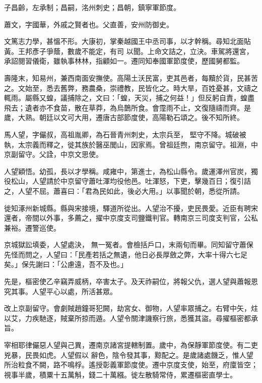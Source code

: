 \begin{pinyinscope}
 子昌齡，左承制；昌嗣，洺州刺史；昌朝，鎮寧軍節度。



 蕭文，字國華，外戚之賢者也。父直善，安州防御史。



 文篤志力學，甚慍不形。大康初，掌秦越國王中丞司事，以才幹稱。尋知北面貼黃。王邦彥子爭蔭，數歲不能定，有司
 以聞。上命文詰之，立決。車駕將還宮，承詔閱習儀衛，雖執事林林，指顧如一。遷同知奉國軍節度使，歷國舅都監。



 壽隆末，知易州，兼西南面安撫使。高陽土沃民富，吏其邑者，每黷於貨，民甚苦之。文始至，悉去舊弊，務農桑，崇禮教，民皆化之。時大旱，百姓憂甚，文禱之輒雨。屬縣又蝗，議捕除之，文曰：「蝗，天災，捕之何益！」但反躬自責，蝗盡飛去；遺者亦不食苗，散在草莽，為烏鵲所食。會霪雨不止，文復隨禱而齊。是歲，大熟。朝廷以文可大用，遷唐古部節度使，高陽勒石頌之。後不知所終。



 馬人望，字儼叔，高祖胤卿，為石晉青州刺史，太宗兵至，
 堅守不降。城破被執，太宗義而釋之，徙其族於醫巫閭山，因家焉。曾祖廷煦，南京留守。祖淵，中京副留守。父詮，中京文思使。



 人望穎悟。幼孤，長以才學稱。咸雍中，第進士，為松山縣令。歲運澤州官炭，獨役松山，人望請於中京留守蕭吐渾均役他邑。吐渾怒，下吏，擊幾百日；復引詰之，人望不屈。蕭喜曰：「君為民如此，後必大用。」以事聞於朝，悉從所請。



 徙知涿州新城縣。縣與宋接境，驛道所從出。人望治不擾，吏民畏愛。近臣有聘宋還者，帝間以外事，多薦之，擢中京度支司鹽鐵判官。轉南京三司度支判官，公私兼裕。遷警巡使。



 京城獄訟填委，人望處決，
 無一冤者。會檢括戶口，末兩旬而畢。同知留守蕭保先怪而問之，人望曰：「民產若括之無遺，他日必長厚斂之弊，大率十得六七足矣。」保先謝曰：「公慮遠，吾不及也。」



 先是，樞密使乙辛竊弄威柄，卒害太子。及天祚嗣位，將報父仇，選人望與蕭報恩究其事。人望平心以處，所活甚眾。



 改上京副留守。會劇賊趙鐘哥犯闕，劫宮女、御物，人望率眾捕之。右臂中矢，炷以艾，力疾馳逐，賊棄所掠而遁。人望令關津譏察行旅，悉獲其盜。尋擢樞密都承旨。



 宰相耶律儼惡人望與己異，遷南京諸宮提轄制置。歲中，為保靜軍節度使。有二吏兇暴，民畏如虎。人望假以
 辭色，陰令發其事，黥配之。是歲諸處饑乏，惟人望所治粒食不闕，路不鳴桴。遙授彰義軍節度使。遷中京度支使，始至，府廩皆空；視事半歲，積粟十五萬斛，錢二十萬繦。徙左散騎常侍，累遷樞密直學士。




\end{pinyinscope}
